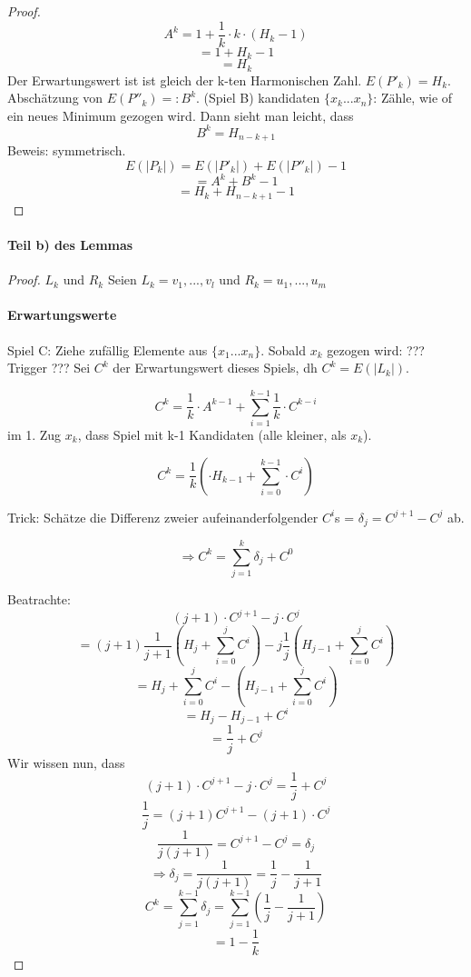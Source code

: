 \documentclass[ngerman]{scrartcl}
\begin{document}
\begin{proof}
$$A^k = 1 + \frac{1}{k} \cdot k \cdot (H_k - 1)$$
$$    = 1 + H_k - 1$$
$$    = H_k$$
Der Erwartungswert ist ist gleich der k-ten Harmonischen Zahl. $E(P'_k) = H_k$. Abschätzung von $E(P''_k) =: B^k$. (Spiel B) kandidaten $ \{ x_k ... x_n\} $: Zähle, wie of ein neues Minimum gezogen wird. Dann sieht man leicht, dass 
$$B^k = H_{n-k+1}$$
Beweis: symmetrisch.
$$E(|P_k|) = E(|P'_k|) + E(|P''_k|) - 1 $$
$$ = A^k + B^k - 1 $$
$$ = H_k + H_{n-k+1} - 1 $$

\end{proof}

\paragraph{Teil b) des Lemmas}

\begin{proof}{$L_k$ und $R_k$}
Seien $ L_k = v_1, ... , v_l $ und $ R_k = u_1, ... , u_m $
\paragraph{Erwartungswerte}
Spiel C: Ziehe zufällig Elemente aus $ \{x_1 ... x_n \} $.
Sobald $ x_k $ gezogen wird: ??? Trigger ???
Sei $ C^k $ der Erwartungswert dieses Spiels, dh $ C^k = E(|L_k|) $.

$$ C^k = \frac{1}{k} \cdot A^{k-1} + \sum_{i=1}^{k-1} \frac{1}{k} \cdot C^{k-i}$$
im 1. Zug $ x_k $, dass Spiel mit k-1 Kandidaten (alle kleiner, als $ x_k $).

$$ C^k = \frac{1}{k} (\cdot H_{k-1} + \sum_{i=0}^{k-1} \cdot C^{i})$$

Trick: Schätze die Differenz zweier aufeinanderfolgender $ C^i $s = $ \delta_j = C^{j+1} - C ^j $ ab.

$$\Rightarrow C^k = \sum_{j=1}^k \delta_j + C^0$$

Beatrachte: 
$$ (j + 1) \cdot C^{j+1} - j \cdot C ^j $$
$$ = (j + 1) \frac{1}{j+1} (H_j + \sum_{i=0}^j C^i) - j \frac{1}{j} (H_{j-1} + \sum_{i=0}^j C^i)$$
$$ = H_j + \sum_{i=0}^j C^i - (H_{j-1} + \sum_{i=0}^j C^i)$$
$$ = H_j - H_{j-1} + C^i$$ 
$$ = \frac{1}{j} + C^j$$
Wir wissen nun, dass
$$ (j + 1) \cdot C^{j+1} - j \cdot C ^j  = \frac{1}{j} + C^j$$
$$ \frac{1}{j} = (j+1) C^{j+1} - (j+1) \cdot C^j $$
$$ \frac{1}{j(j+1)} = C^{j+1} - C^j = \delta_j $$
$$ \Rightarrow \delta_j = \frac{1}{j(j+1)} = \frac{1}{j} - \frac{1}{j+1}$$
$$ C^k = \sum_{j=1}^{k-1} \delta_j = \sum_{j=1}^{k-1} (\frac{1}{j} - \frac{1}{j+1})$$
$$ = 1 - \frac{1}{k}$$

\end{proof}
\end{document}
